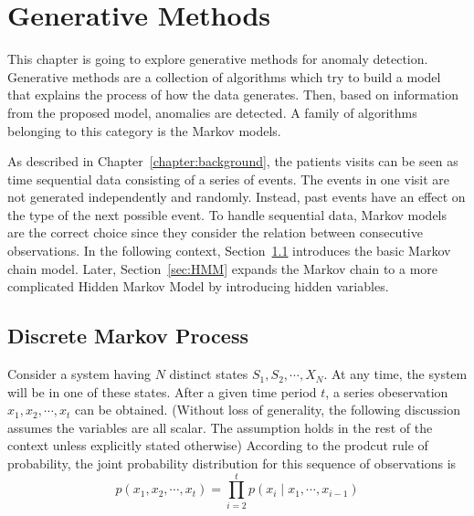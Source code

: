 \chapter{Generative Methods}
\label{chapter:generative}
This chapter is going to explore generative methods for anomaly detection. Generative methods are a collection of algorithms which try to build a model that explains the process of how the data generates. Then, based on information from the proposed model, anomalies are detected. A family of algorithms belonging to this category is the Markov models.

As described in Chapter~\ref{chapter:background}, the patients visits can be seen as time sequential data consisting of a series of events. The events in one visit are not generated independently and randomly. Instead, past events have an effect on the type of the next possible event. To handle sequential data, Markov models are the correct choice since they consider the relation between consecutive observations. In the following context, Section~\ref{sec:MM} introduces the basic Markov chain model. Later, Section~\ref{sec:HMM} expands the Markov chain to a more complicated Hidden Markov Model by introducing hidden variables.

\section{Discrete Markov Process}
\label{sec:MM}
Consider a system having \(N\) distinct states \(S_1, S_2, \cdots, X_N\). At any time, the system will be in one of these states. After a given time period \(t\), a series obeservation \(x_1, x_2, \cdots, x_t\) can be obtained. (Without loss of generality, the following discussion assumes the variables are all scalar. The assumption holds in the rest of the context unless explicitly stated otherwise) According to the prodcut rule of probability, the joint probability distribution for this sequence of observations is
\begin{equation}
	p(x_1, x_2, \cdots, x_t) = \prod_{i = 2}^{t} p(x_i \mid x_1, \cdots, x_{i-1})
\end{equation}

